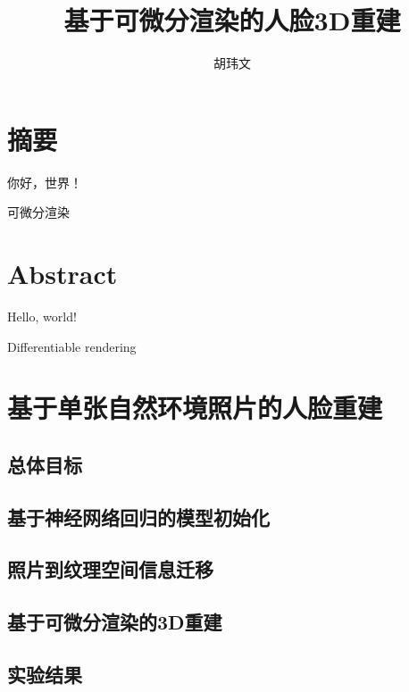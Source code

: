 \documentclass{scutmaster}
\title{基于可微分渲染的人脸3D重建}
\author{胡玮文}
\begin{document}
\maketitle
\maketitleEN
\nominationpage
\declareoforiginality

\frontmatter
\chapter{摘要}

你好，世界！

 可微分渲染

\chapter{Abstract}

Hello, world!

 Differentiable rendering

\tableofcontents

\listoffigures

\mainmatter






\chapter{基于单张自然环境照片的人脸重建}
\label{chap:recon}

\section{总体目标}

\section{基于神经网络回归的模型初始化}

\section{照片到纹理空间信息迁移}

\section{基于可微分渲染的3D重建}

\section{实验结果}
\end{document}
